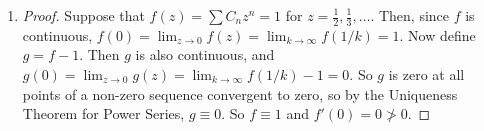 \documentclass[11pt, letterpaper]{article}
\begin{document}
\begin{enumerate}
\begin{enumerate}
\begin{proof}
      We have that $a_n^{1/n} = 1/2$ when $n$ is odd and $a_n^{1/n} = (2^{-n} \cdot 2^2)^{1/n} = 
      \frac{4^{1/n}}{2}$ when $n$ is even, which is monotonically decreasing since $4^{1/n} \geq 4^{\frac{1}{n + 1}}$ for all $n$. So, $\sup \lbrace a_n^{1/n} : n \geq N \rbrace = \max \lbrace 1/2, \frac{4^{1/N}}{2} \rbrace$, so $\limsup a_n^{1/n} = \lim_{N \to \infty} \max \lbrace 1/2, \frac{4^{1/N}}{2} \rbrace = 1/2$.

    \end{proof}
  \end{enumerate}

  \item \begin{proof}
    Suppose that $f(z) = \sum C_n z^n = 1$ for $z = \frac{1}{2}, \frac{1}{3}, \dots$. Then, since $f$ is continuous, $f(0) = \lim_{z \to 0} f(z) = \lim_{k \to \infty} f(1/k) = 1$. Now define $g = f - 1$. Then $g$ is also continuous, and $g(0) = \lim_{z \to 0} g(z) = \lim_{k \to \infty} f(1/k) - 1 = 0$. So $g$ is zero at all points of a non-zero sequence convergent to zero, so by the Uniqueness Theorem for Power Series, $g \equiv 0$. So $f \equiv 1$ and $f'(0) = 0 \not> 0$.
  \end{proof}
  
\end{enumerate}
\end{document}
